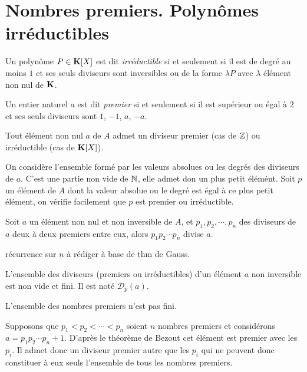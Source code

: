 \section{Nombres premiers. Polynômes irréductibles}
\begin{defi}
 Un polynôme $P\in \mathbf{K}[X]$ est dit \emph{irréductible} si et seulement si il est de degré au moins $1$ et ses seuls diviseurs sont inversibles ou de la forme $\lambda P$ avec $\lambda$ élément non nul de $\mathbf{K}$. 
\end{defi}
\begin{defi}
 Un entier naturel $a$ est dit \emph{premier} si et seulement si il est supérieur ou égal à $2$ et ses seuls diviseurs sont $1$, $-1$, $a$, $-a$.
\end{defi}
\begin{prop}
 Tout élément non nul $a$ de $A$ admet un diviseur premier (cas de $\mathbb{Z}$) ou irréductible (cas de $\mathbf{K}[X]$).
\end{prop}
\begin{demo}
 On considère l'ensemble formé par les valeurs absolues ou les degrés des diviseurs de $a$. C'est une partie non vide de $\mathbb{N}$, elle admet don un plus petit élémént. Soit $p$ un élément de $A$ dont la valeur absolue ou le degré est égal à ce plus petit élément, on vérifie facilement que $p$ est premier ou irréductible. 
\end{demo}
\begin{prop}
 Soit $a$ un élément non nul et non inversible de $A$, et $p_1, p_2, \cdots, p_n$ des diviseurs de $a$ deux à deux premiers entre eux, alors $p_1p_2\cdots p_n$ divise $a$.
\end{prop}
\begin{demo}
 récurrence sur $n$ à rédiger à base de thm de Gauss.
\end{demo}
\begin{nota}
L'ensemble des diviseurs (premiers ou irréductibles) d'un élément $a$ non inversible est non vide et fini. Il est noté $\mathcal D_p(a)$. 
\end{nota}
\begin{prop}
L'ensemble des nombres premiers n'est pas fini. 
\end{prop}
\begin{defi}
 Supposons que $p_1<p_2<\cdots<p_n$ soient $n$ nombres premiers  et considérons $a=p_1p_2\cdots p_n+1$. D'après le théorème de Bezout cet élément est premier avec les $p_i$. Il admet donc un diviseur premier autre que les $p_i$ qui ne peuvent donc constituer à eux seuls l'ensemble de tous les nombres premiers. 
\end{defi}
